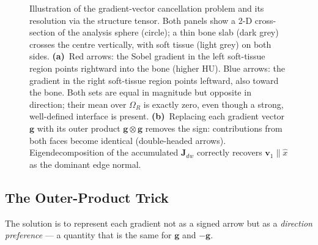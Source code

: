 \documentclass[11pt,a4paper]{article}
\newcommand{\vg}{\mathbf{g}}
\begin{document}
\begin{figure}[h!]
\caption{Illustration of the gradient-vector cancellation problem and its
resolution via the structure tensor.
Both panels show a 2-D cross-section of the analysis sphere (circle); a thin
bone slab (dark grey) crosses the centre vertically, with soft tissue (light
grey) on both sides.
\textbf{(a)}~Red arrows: the Sobel gradient in the left soft-tissue region
points rightward into the bone (higher HU).
Blue arrows: the gradient in the right soft-tissue region points leftward,
also toward the bone.
Both sets are equal in magnitude but opposite in direction; their mean over
$\Omega_R$ is exactly zero, even though a strong, well-defined interface is
present.
\textbf{(b)}~Replacing each gradient vector $\vg$ with its outer product
$\vg\!\otimes\!\vg$ removes the sign: contributions from both faces become
identical (double-headed arrows).
Eigendecomposition of the accumulated $\mathbf{J}_{dw}$ correctly recovers
$\mathbf{v}_1 \parallel \hat{x}$ as the dominant edge normal.}
\label{fig:cancellation}
\end{figure}

\subsection{The Outer-Product Trick}

The solution is to represent each gradient not as a signed arrow but as a
\emph{direction preference} — a quantity that is the same for $\vg$ and
$-\vg$.
\end{document}
